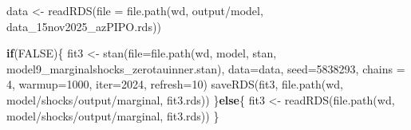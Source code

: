 \documentclass[
  letterpaper,
  DIV=11,
  numbers=noendperiod]{scrartcl}
\newenvironment{Shaded}{\begin{snugshade}}{\end{snugshade}}
\newcommand{\AttributeTok}[1]{\textcolor[rgb]{0.40,0.45,0.13}{#1}}
\newcommand{\ConstantTok}[1]{\textcolor[rgb]{0.56,0.35,0.01}{#1}}
\newcommand{\ControlFlowTok}[1]{\textcolor[rgb]{0.00,0.23,0.31}{\textbf{#1}}}
\newcommand{\DecValTok}[1]{\textcolor[rgb]{0.68,0.00,0.00}{#1}}
\newcommand{\FunctionTok}[1]{\textcolor[rgb]{0.28,0.35,0.67}{#1}}
\newcommand{\NormalTok}[1]{\textcolor[rgb]{0.00,0.23,0.31}{#1}}
\newcommand{\OtherTok}[1]{\textcolor[rgb]{0.00,0.23,0.31}{#1}}
\newcommand{\StringTok}[1]{\textcolor[rgb]{0.13,0.47,0.30}{#1}}
\begin{document}
\linespread{0.5}

\begin{Shaded}
\begin{Highlighting}[]
\NormalTok{data }\OtherTok{\textless{}{-}} \FunctionTok{readRDS}\NormalTok{(}\AttributeTok{file =} \FunctionTok{file.path}\NormalTok{(wd, }\StringTok{\textquotesingle{}output/model\textquotesingle{}}\NormalTok{, }\StringTok{\textquotesingle{}data\_15nov2025\_azPIPO.rds\textquotesingle{}}\NormalTok{))}

\ControlFlowTok{if}\NormalTok{(}\ConstantTok{FALSE}\NormalTok{)\{}
\NormalTok{  fit3 }\OtherTok{\textless{}{-}} \FunctionTok{stan}\NormalTok{(}\AttributeTok{file=}\FunctionTok{file.path}\NormalTok{(wd, }\StringTok{\textquotesingle{}model\textquotesingle{}}\NormalTok{, }\StringTok{\textquotesingle{}stan\textquotesingle{}}\NormalTok{, }\StringTok{\textquotesingle{}model9\_marginalshocks\_zerotauinner.stan\textquotesingle{}}\NormalTok{),}
            \AttributeTok{data=}\NormalTok{data, }\AttributeTok{seed=}\DecValTok{5838293}\NormalTok{, }\AttributeTok{chains =} \DecValTok{4}\NormalTok{,}
            \AttributeTok{warmup=}\DecValTok{1000}\NormalTok{, }\AttributeTok{iter=}\DecValTok{2024}\NormalTok{, }\AttributeTok{refresh=}\DecValTok{10}\NormalTok{)}
  \FunctionTok{saveRDS}\NormalTok{(fit3, }\FunctionTok{file.path}\NormalTok{(wd, }\StringTok{\textquotesingle{}model/shocks/output/marginal\textquotesingle{}}\NormalTok{, }\StringTok{\textquotesingle{}fit3.rds\textquotesingle{}}\NormalTok{))}
\NormalTok{\}}\ControlFlowTok{else}\NormalTok{\{}
\NormalTok{  fit3 }\OtherTok{\textless{}{-}} \FunctionTok{readRDS}\NormalTok{(}\FunctionTok{file.path}\NormalTok{(wd, }\StringTok{\textquotesingle{}model/shocks/output/marginal\textquotesingle{}}\NormalTok{, }\StringTok{\textquotesingle{}fit3.rds\textquotesingle{}}\NormalTok{))}
\NormalTok{\}}
\end{Highlighting}
\end{Shaded}

\linespread{2}

\linespread{0.5}
\end{document}
